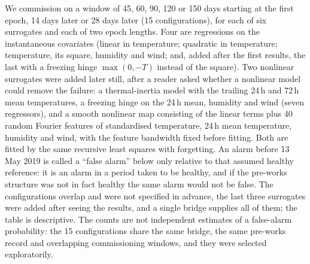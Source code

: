 \documentclass[12pt,a4paper]{article}
\newenvironment{revblock}{}{}
\newenvironment{revblock}{\begingroup\color{revcol}}{\endgroup}
\newcommand{\rtwo}[1]{#1}
\newcommand{\rtwo}[1]{{\color{revcolb}#1}}
\begin{document}
\begin{revblock}
We commission on a window of 45, 60, 90, 120 or 150 days starting at the first epoch, 14 days later or 28 days later (15 configurations), for each of six surrogates and each of two epoch lengths. Four are regressions on the instantaneous covariates (linear in temperature; quadratic in temperature; temperature, its square, humidity and wind; and, added after the first results, the last with a freezing hinge $\max(0,-T)$ instead of the square). Two nonlinear surrogates were added later still, after a reader asked whether a nonlinear model could remove the failure: a thermal-inertia model with the trailing 24\,h and 72\,h mean temperatures, a freezing hinge on the 24\,h mean, humidity and wind (seven regressors), and a smooth nonlinear map consisting of the linear terms plus 40 random Fourier features of standardised temperature, 24\,h mean temperature, humidity and wind, with the feature bandwidth fixed before fitting. Both are fitted by the same recursive least squares with forgetting. \rtwo{\rtwo{An alarm before 13 May 2019 is called a ``false alarm'' below only relative to that assumed healthy reference: it is an alarm in a period taken to be healthy, and if the pre-works structure was not in fact healthy the same alarm would not be false.} The configurations overlap and were not specified in advance, the last three surrogates were added after seeing the results, and a single bridge supplies all of them; the table is descriptive.} \rtwo{\rtwo{The counts are not independent estimates of a false-alarm probability: the 15 configurations share the same bridge, the same pre-works record and overlapping commissioning windows, and they were selected exploratorily.}}


\end{revblock}
\end{document}

